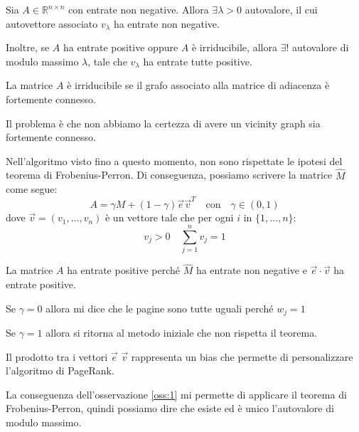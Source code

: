 \begin{teorema} 
    Sia $A\in \mathbb{R}^{n\times n}$ con entrate non negative. Allora $\exists \lambda>0$
    autovalore, il cui autovettore associato $v_\lambda$ ha entrate non negative.

    Inoltre, se $A$ ha entrate positive oppure $A$ è irriducibile, allora $\exists
        !$ autovalore di modulo massimo $\lambda$, tale che $v_{\lambda}$ ha
    entrate tutte positive.
\end{teorema}
\begin{definizione}
    La matrice $A$ è irriducibile se il grafo associato alla matrice di adiacenza
    è fortemente connesso.
\end{definizione}
Il problema è che non abbiamo la certezza di avere un vicinity graph sia fortemente
connesso.

Nell'algoritmo visto fino a questo momento, non sono rispettate le ipotesi del
teorema di Frobenius-Perron. Di conseguenza, possiamo scrivere la matrice $\hat{M}$
come segue:
\begin{equation}
    A = \gamma M + (1 - \gamma) \vec{e} \vec{v}^T \quad \text{con} \quad \gamma \in (0, 1)
\end{equation}
dove $\vec{v} = (v_1, \ldots, v_n)$ è un vettore tale che per ogni $i$ in $\{1,
    \ldots, n\}$:
\begin{equation}
    v_j > 0 \quad \sum_{j = 1}^n v_j = 1
\end{equation}
\begin{osservazione}\label{oss:1}
    La matrice $A$ ha entrate positive perché $\hat{M}$ ha entrate non negative e
    $\vec{e} \cdot \vec{v}$ ha entrate positive.
\end{osservazione}
\begin{osservazione}
    Se $\gamma = 0$ allora mi dice che le pagine sono tutte uguali perché $w_j = 1$

    Se $\gamma = 1$ allora si ritorna al metodo iniziale che non rispetta il teorema.
\end{osservazione}
Il prodotto tra i vettori $\vec{e}$ $\vec{v}$ rappresenta un bias che permette
di personalizzare l'algoritmo di PageRank.

La conseguenza dell'osservazione \ref{oss:1} mi permette di applicare il teorema
di Frobenius-Perron, quindi possiamo dire che esiste ed è unico l'autovalore di
modulo massimo.

